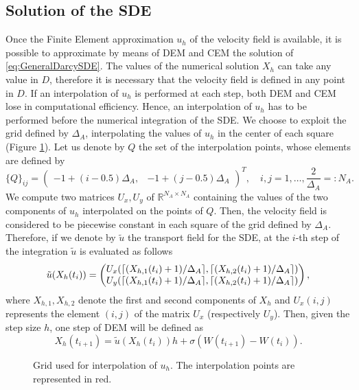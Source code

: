 \subsection{Solution of the SDE}

Once the Finite Element approximation $u_h$ of the velocity field is available, it is possible to approximate by means of DEM and CEM the solution of \eqref{eq:GeneralDarcySDE}. The values of the numerical solution $X_h$ can take any value in $D$, therefore it is necessary that the velocity field is defined in any point in $D$. If an interpolation of $u_h$ is performed at each step, both DEM and CEM lose in computational efficiency. Hence, an interpolation of $u_h$ has to be performed before the numerical integration of the SDE. We choose to exploit the grid defined by $\Delta_A$, interpolating the values of $u_h$ in the center of each square (Figure \ref{fig:GridVelocity}). Let us denote by $Q$ the set of the interpolation points, whose elements are defined by
\begin{equation}\label{eq:InterpMatrix}
	\{Q\}_{ij} = \begin{pmatrix} -1 + (i-0.5)\Delta_A, & -1 + (j-0.5)\Delta_A \end{pmatrix}^T, \quad i,j = 1, \dots, \frac{2}{\Delta_A} =: N_A.
\end{equation}
We compute two matrices $U_x, U_y$ of $\mathbb{R}^{N_A \times N_A}$ containing the values of the two components of $u_h$ interpolated on the points of $Q$. Then, the velocity field is considered to be piecewise constant in each square of the grid defined by $\Delta_A$. Therefore, if we denote by $\tilde{u}$ the transport field for the SDE, at the $i$-th step of the integration $\tilde{u}$ is evaluated as follows
\begin{equation}\label{eq:VelEval}
	\tilde{u}(X_h(t_i)) = \begin{pmatrix}	U_x(\lceil(X_{h,1}(t_i)+1)/\Delta_A\rceil,\lceil(X_{h,2}(t_i)+1)/\Delta_A\rceil) \\
					U_y(\lceil(X_{h,1}(t_i)+1)/\Delta_A\rceil,\lceil(X_{h,2}(t_i)+1)/\Delta_A\rceil) \end{pmatrix},
\end{equation}
where $X_{h,1}, X_{h,2}$ denote the first and second components of $X_h$ and $U_x(i,j)$ represents the element $(i,j)$ of the matrix $U_x$ (respectively $U_y$). Then, given the step size $h$, one step of DEM will be defined as
\begin{equation}
	X_h(t_{i+1}) = \tilde{u}(X_h(t_i)) h + \sigma (W(t_{i+1}) - W(t_i)).
\end{equation}

\begin{figure}[t]
    \centering
    \resizebox{0.8\linewidth}{!}{ }  
    \caption{Grid used for interpolation of $u_h$. The interpolation points are represented in red.}
    \label{fig:GridVelocity}
\end{figure}

